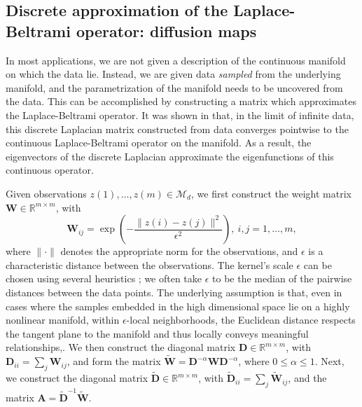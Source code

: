 \documentclass[3p]{elsarticle}
\begin{document}
\subsection{Discrete approximation of the Laplace-Beltrami operator: diffusion maps}

In most applications, we are not given a description of the continuous manifold on which the data lie.
%
Instead, we are given data {\em sampled} from the underlying manifold,
and the parametrization of the manifold needs to be uncovered from the data.
%
This can be accomplished by constructing a matrix which approximates the Laplace-Beltrami operator.
%
It was shown in \cite{coifman2006geometric} that, in the limit of infinite data,
this discrete Laplacian matrix constructed from data converges pointwise to the continuous Laplace-Beltrami operator on the manifold.
%
As a result, the eigenvectors of the discrete Laplacian approximate the eigenfunctions of this continuous operator.

Given observations $z(1), \dots, z(m) \in \mathcal{M}_d$, we first construct the weight matrix $\mathbf{W} \in \mathbb{R}^{m \times m}$, with
\begin{equation} \label{eq:W}
\mathbf{W}_{ij} = \exp \left( -\frac{\|z(i) - z(j) \|^2}{\epsilon^2} \right), \ i,j=1,\ldots,m,
\end{equation}
where $\| \cdot \|$ denotes the appropriate norm for the observations, and $\epsilon$ is a characteristic distance between the observations.
%
The kernel's scale $\epsilon$ can be chosen using several heuristics \cite{rohrdanz2011determination, coifman2008graph};
we often take $\epsilon$ to be the median of the pairwise distances between the data points. 
%
The underlying assumption is that, even in cases where the samples embedded in the high dimensional space lie on a highly nonlinear manifold, within $\epsilon$-local neighborhoods, the Euclidean distance respects the tangent plane to the manifold and thus locally conveys meaningful relationships,. 
%
We then construct the diagonal matrix $\mathbf{D} \in \mathbb{R}^{m \times m}$, with $\mathbf{D}_{ii} = \sum_j \mathbf{W}_{ij}$,
and form the matrix $\widetilde{\mathbf{W}} = \mathbf{D}^{-\alpha} \mathbf{W} \mathbf{D}^{-\alpha}$, where $0 \le \alpha \le 1$.
%
Next, we construct the diagonal matrix $\widetilde{\mathbf{D}} \in \mathbb{R}^{m \times m}$, with $\widetilde{\mathbf{D}}_{ii} = \sum_j \widetilde{\mathbf{W}}_{ij}$, and the matrix $\mathbf{A}  = \widetilde{\mathbf{D}}^{-1} \widetilde{\mathbf{W}}.$
\end{document}
